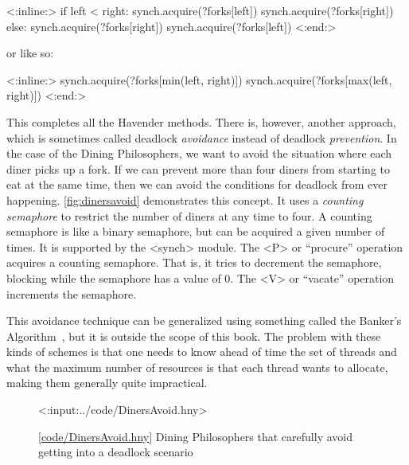 \documentclass{report}
\newcommand{\harmonylink}[1]{%
[\href{https://harmony.cs.cornell.edu/#1}{\underline{#1}}]%
}
\newenvironment{code}{
\tcolorbox
}{
\endtcolorbox
}
\begin{document}
\vspace{1em}
\begin{code}
<{:inline:}>
if left < right:
    synch.acquire(?forks[left])
    synch.acquire(?forks[right])
else:
    synch.acquire(?forks[right])
    synch.acquire(?forks[left])
<{:end:}>
\end{code}
\vspace{1em}

or like so:

\vspace{1em}
\begin{code}
<{:inline:}>
synch.acquire(?forks[min(left, right)])
synch.acquire(?forks[max(left, right)])
<{:end:}>
\end{code}
\vspace{1em}

This completes all the Havender methods.
There is, however, another approach, which is sometimes called deadlock
\emph{avoidance}
%
instead of deadlock \emph{prevention}.
In the case of the Dining Philosophers, we want to avoid the situation where each
diner picks up a fork.  If we can prevent more than four diners from starting to
eat at the same time, then we can avoid the conditions for deadlock from ever
happening.
\autoref{fig:dinersavoid} demonstrates this concept.  It uses a
\emph{counting semaphore} to restrict the number of diners at any time to
four.  A counting semaphore is like a binary semaphore, but can be
acquired a given number of times.  It is supported by the <{synch}>
module.  The <{P}> or ``procure'' operation acquires a counting
semaphore.  That is, it tries to decrement the semaphore, blocking while
the semaphore has a value of 0.  The <{V}> or ``vacate'' operation
increments the semaphore.

This avoidance technique can be generalized using something called the
Banker's Algorithm~\cite{EWD108}, but it is outside the scope of this book.
The problem with these kinds of schemes is that one needs to know ahead of time
the set of threads and what the maximum number of resources is that each thread
wants to allocate, making them generally quite impractical.

\begin{figure}
\begin{code}
<{:input:../code/DinersAvoid.hny}>
\end{code}
\caption{\harmonylink{code/DinersAvoid.hny} Dining Philosophers that carefully avoid getting into a deadlock
scenario}
\label{fig:dinersavoid}
\end{figure}
\end{document}
